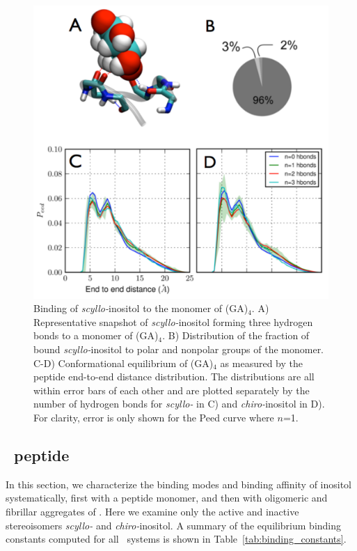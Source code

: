 \begin{figure}[htbp]
  \centering
  \includegraphics[width=5in]{figures/results1/GA4_paper_figures_submitted-3-rearranged}
  \caption[Binding of \textit{scyllo-}inositol to the monomer of (GA)$_4$.]{Binding of \textit{scyllo-}inositol to the monomer of (GA)$_4$. A) Representative snapshot of \textit{scyllo-}inositol forming three hydrogen bonds to a monomer of (GA)$_4$. B) Distribution of the fraction of bound \textit{scyllo-}inositol to polar and nonpolar groups of the monomer. C-D) Conformational equilibrium of (GA)$_4$ as measured by the peptide end-to-end distance distribution. The distributions are all within error bars of each other and are plotted separately by the number of hydrogen bonds for \textit{scyllo-} in C) and \textit{chiro-}inositol in D). For clarity, error is only shown for the Peed curve where $n$=1.}
   \label{fig:figure3}
\end{figure}

\subsection{\gafour\ peptide}
In this section, we characterize the binding modes and binding affinity of inositol systematically, first with a peptide monomer, and then with oligomeric and fibrillar aggregates of \gafour. Here we examine only the active and inactive stereoisomers \textit{scyllo-} and \textit{chiro-}inositol. A summary of the equilibrium binding constants computed for all \gafour\ systems is shown in Table~\ref{tab:binding_constants}.

